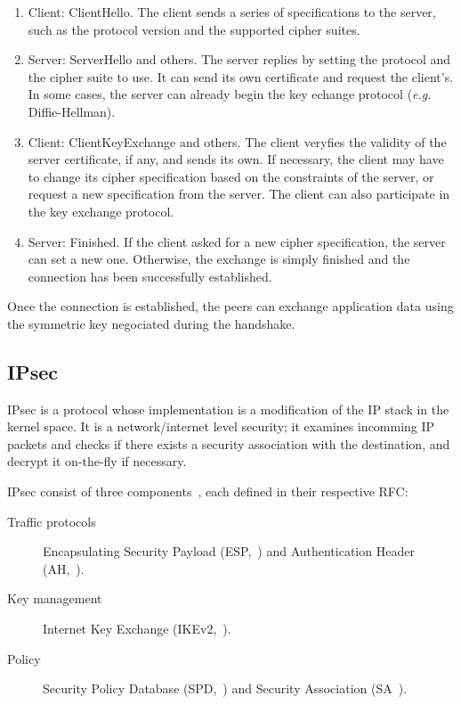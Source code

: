 \begin{enumerate}
	\item Client: ClientHello. The client sends a series of specifications to the server, such as the protocol version and the supported cipher suites.
	\item Server: ServerHello and others. The server replies by setting the protocol and the cipher suite to use.
	It can send its own certificate and request the client's.
	In some cases, the server can already begin the key echange protocol (\textit{e.g.} Diffie-Hellman).
	\item Client: ClientKeyExchange and others. The client veryfies the validity of the server certificate, if any, and sends its own. If necessary, the client may have to change its cipher specification based on the constraints of the server, or request a new specification from the server.
	The client can also participate in the key exchange protocol.
	\item Server: Finished. If the client asked for a new cipher specification, the server can set a new one. Otherwise, the exchange is simply finished and the connection has been successfully established.
\end{enumerate}

Once the connection is established, the peers can exchange application data using the symmetric key negociated during the handshake.








\subsection{IPsec}
IPsec is a protocol whose implementation is a modification of the IP stack in the kernel space.
It is a network/internet level security; it examines incomming IP packets and checks if there exists a security association with the destination, and decrypt it on-the-fly if necessary.


IPsec consist of three components~\cite{cryptoencyclopedia2011}, each defined in their respective RFC:
\begin{description}
	\item[Traffic protocols] Encapsulating Security Payload (ESP,~\cite{rfc4303}) and Authentication Header (AH,~\cite{rfc4302}).
	\item[Key management] Internet Key Exchange (IKEv2,~\cite{rfc7296}).
	\item[Policy]Security Policy Database (SPD,~\cite{rfc4301}) and Security Association (SA~\cite{rfc4301}).
\end{description}

